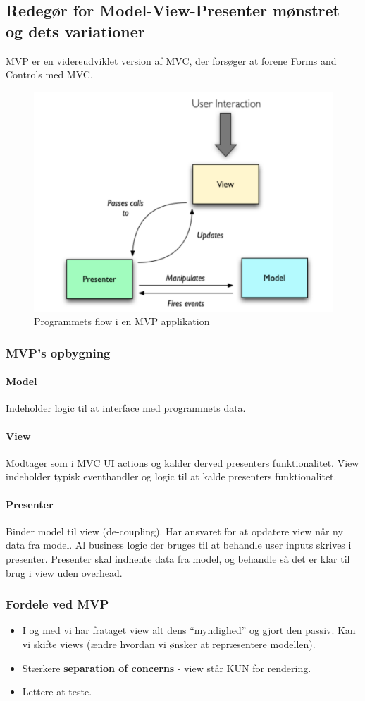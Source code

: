 \subsection{Redegør for Model-View-Presenter mønstret og dets variationer}
MVP er en videreudviklet version af MVC, der forsøger at forene Forms and Controls med MVC.

\begin{figure}[h]
	\centering
	\includegraphics[width=0.7\linewidth]{figs/mvpFlow}
	\caption{Programmets flow i en MVP applikation}
	\label{fig:mvpFlow}
\end{figure}

\subsubsection{MVP's opbygning}
\paragraph{Model} Indeholder logic til at interface med programmets data.
\paragraph{View} Modtager som i MVC UI actions og kalder derved presenters funktionalitet. View indeholder typisk eventhandler og logic til at kalde presenters funktionalitet.
\paragraph{Presenter} Binder model til view (de-coupling). Har ansvaret for at opdatere view når ny data fra model. Al business logic der bruges til at behandle user inputs skrives i presenter. Presenter skal indhente data fra model, og behandle så det er klar til brug i view uden overhead.

\subsubsection{Fordele ved MVP}
\begin{itemize}
	\item I og med vi har frataget view alt dens “myndighed” og gjort den passiv. Kan vi skifte views (ændre hvordan vi ønsker at repræsentere modellen).
	\item Stærkere \textbf{separation of concerns} - view står KUN for rendering.
	\item Lettere at teste.
\end{itemize}

